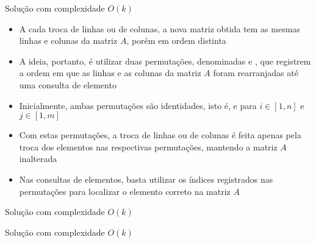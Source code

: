 \begin{frame}[fragile]{Solução com complexidade $O(k)$}

    \begin{itemize}
        \item A cada troca de linhas ou de colunas, a nova matriz obtida tem as mesmas linhas e
            colunas da matriz $A$, porém em ordem distinta

        \item A ideia, portanto, é utilizar duas permutações, denominadas  e 
            , que registrem a ordem em que as linhas e as colunas da matriz $A$
            foram rearranjadas até uma consulta de elemento

        \item Inicialmente, ambas permutações são identidades, isto é,  e
             para $i\in [1, n]$ e $j\in [1, m]$

        \item Com estas permutações, a troca de linhas ou de colunas é feita apenas pela troca
            dos elementos nas respectivas permutações, mantendo a matriz $A$ inalterada

        \item Nas consultas de elementos, basta utilizar os índices registrados nas permutações
            para localizar o elemento correto na matriz $A$
    \end{itemize}

\end{frame}

\begin{frame}[fragile]{Solução com complexidade $O(k)$}
\end{frame}

\begin{frame}[fragile]{Solução com complexidade $O(k)$}
\end{frame}
